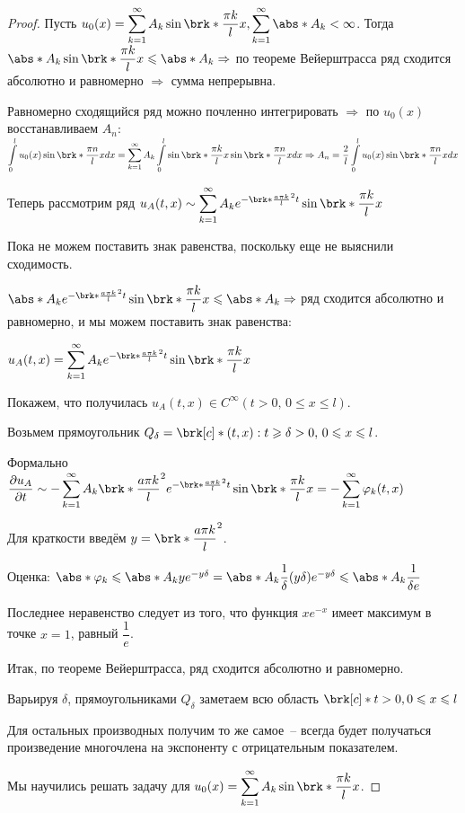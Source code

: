 \begin{proof}
	Пусть $u_0(x) = \displaystyle\sum\limits_{k=1}^{\infty} A_k\sin\brk*{\dfrac{\pi k}{l}x}, \displaystyle\sum\limits_{k=1}^{\infty} \abs*{A_k} < \infty$. Тогда $\abs*{A_k\sin\brk*{\dfrac{\pi k}{l}x}} \leqslant \abs*{A_k} \Rightarrow$ по теореме Вейерштрасса ряд сходится абсолютно и равномерно $\Rightarrow$ сумма непрерывна.

	Равномерно сходящийся ряд можно почленно интегрировать $\Rightarrow$ по $u_0(x)$ восстанавливаем $A_n$: $\displaystyle\int\limits_0^l u_0(x)\sin\brk*{\dfrac{\pi n}{l}x}dx = \displaystyle\sum_{k=1}^{\infty} A_k \displaystyle\int\limits_0^l \sin\brk*{\dfrac{\pi k}{l}x} \sin\brk*{\dfrac{\pi n}{l}x} dx \Rightarrow A_n = \dfrac{2}{l} \displaystyle\int\limits_0^l u_0(x) \sin\brk*{\dfrac{\pi n}{l}x} dx$

	Теперь рассмотрим ряд $u_A(t,x) \sim \displaystyle\sum\limits_{k=1}^{\infty} A_k e^{-\brk*{\frac{a\pi k}{l}}^2t} \sin\brk*{\dfrac{\pi k}{l}x}$

	Пока не можем поставить знак равенства, поскольку еще не выяснили сходимость.

	$\abs*{A_k e^{-\brk*{\frac{a\pi k}{l}}^2t} \sin\brk*{\dfrac{\pi k}{l}x}} \leqslant \abs*{A_k} \Rightarrow$ ряд сходится абсолютно и равномерно, и мы можем поставить знак равенства:

	$u_A(t,x) = \displaystyle\sum\limits_{k=1}^{\infty} A_k e^{-\brk*{\frac{a\pi k}{l}}^2t} \sin\brk*{\dfrac{\pi k}{l}x}$

	Покажем, что получилась $u_A(t,x) \in C^\infty(t>0, \, 0 \leqslant x \leqslant l)$. 

	Возьмем прямоугольник $Q_\delta = \brk[c]*{(t,x) : t \geqslant \delta > 0, \, 0 \leqslant x \leqslant l}$. 

	Формально $\dfrac{\partial u_A}{\partial t} \sim -\displaystyle\sum\limits_{k=1}^{\infty} A_k\brk*{\dfrac{a\pi k}{l}}^2 e^{-\brk*{\frac{a\pi k}{l}}^2t} \sin\brk*{\dfrac{\pi k}{l}x} = -\displaystyle\sum\limits_{k=1}^{\infty} \varphi_k(t,x)$

	Для краткости введём $y = \brk*{\dfrac{a\pi k}{l}}^2$.

	Оценка: $\abs*{\varphi_k} \leqslant \abs*{A_k}ye^{-y\delta} = \abs*{A_k} \dfrac{1}{\delta} (y\delta) e^{-y\delta} \leqslant \abs*{A_k} \dfrac{1}{\delta e}$

	Последнее неравенство следует из того, что функция $xe^{-x}$ имеет максимум в точке $x = 1$, равный $\dfrac{1}{e}$.

	Итак, по теореме Вейерштрасса, ряд сходится абсолютно и равномерно.

	Варьируя $\delta$, прямоугольниками $Q_\delta$ заметаем всю область $\brk[c]*{t > 0, 0 \leqslant x \leqslant l}$

	Для остальных производных получим то же самое~-- всегда будет получаться произведение многочлена на экспоненту с отрицательным показателем.

	Мы научились решать задачу для $u_0(x) = \displaystyle\sum\limits_{k=1}^{\infty} A_k \sin\brk*{\dfrac{\pi k}{l}x}$.
\end{proof}

